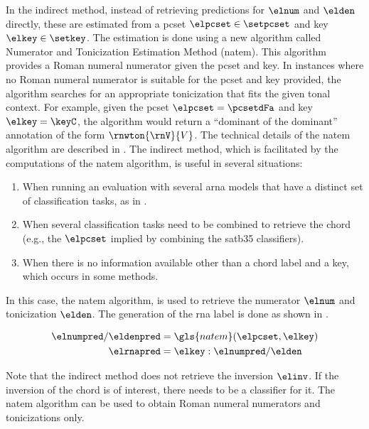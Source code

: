 

In the indirect method, instead of retrieving predictions
for $\elnum$ and $\elden$ directly, these are estimated from
a \gls{pcset} $\elpcset \in \setpcset$ and key $\elkey \in
\setkey$. The estimation is done using a new algorithm
called Numerator and Tonicization Estimation Method
(\gls{natem}). This algorithm provides a Roman numeral
numerator given the \gls{pcset} and key. In instances where
no Roman numeral numerator is suitable for the \gls{pcset}
and key provided, the algorithm searches for an appropriate
tonicization that fits the given tonal context. For example,
given the \gls{pcset} $\elpcset = \pcsetdFa$ and key $\elkey
= \keyC$, the algorithm would return a ``dominant of the
dominant'' annotation of the form $\rnwton{\rnV}{V}$. The
technical details of the \gls{natem} algorithm are described
in . The
indirect method, which is facilitated by the computations of
the \gls{natem} algorithm, is useful in several situations: 

\begin{enumerate}
    \item When running an evaluation with several \gls{arna}
    models that have a distinct set of classification tasks,
    as in .
    \item When several classification tasks need to be
    combined to retrieve the chord (e.g., the $\elpcset$
    implied by combining the \gls{satb35} classifiers).
    \item When there is no information available other than
    a chord label and a key, which occurs in some methods.
\end{enumerate}

In this case, the \gls{natem} algorithm, is used to retrieve
the numerator $\elnum$ and tonicization $\elden$. The
generation of the \gls{rna} label is done as shown in
.

\begin{equation}
    \label{eq:rna_indirect}
    \begin{split}
        \elnumpred / \eldenpred &= \gls{natem}(\elpcset, \elkey) \\
        \elrnapred &= \elkey : \elnumpred / \elden 
    \end{split}
\end{equation}

Note that the indirect method does not retrieve the
inversion $\elinv$. If the inversion of the chord is of
interest, there needs to be a classifier for it. The
\gls{natem} algorithm can be used to obtain Roman numeral
numerators and tonicizations only. 


